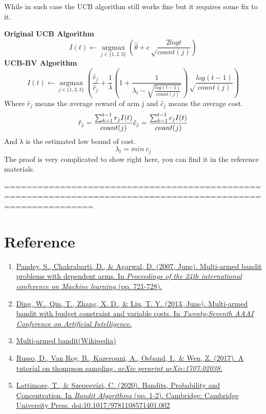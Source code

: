\documentclass[11pt]{article}
\providecommand{\tightlist}{%
      \setlength{\itemsep}{0pt}\setlength{\parskip}{0pt}}
\begin{document}
While in such case the UCB algorithm still works fine but it requires
some fix to it.

\textbf{Original UCB Algorithm} \[
I(t)\leftarrow \mathop{argmax}\limits_{j\in\{1,2,3\}}(\hat \theta+c\sqrt\frac{2logt}{count(j)})
\] \textbf{UCB-BV Algorithm} \[
I(t)\leftarrow \mathop{argmax}\limits_{j\in\{1,2,3\}}(\frac{\hat r_j}{\hat c_j}+\frac{1}{\lambda}\left(1+\frac{1}{\lambda_t-\sqrt{\frac{log(t-1)}{count(j)}}}\right)\sqrt\frac{log(t-1)}{count(j)})
\] Where \(\hat r_j\) means the average reward of arm j and \(\hat c_j\)
means the average cost. \[
\hat r_j=\frac{\sum_{k=1}^{t-1}r_jI(t)}{count(j)}\\
\hat c_j=\frac{\sum_{k=1}^{t-1}c_jI(t)}{count(j)}\\
\] And λ is the estimated low bound of cost. \[
\lambda_t=min\ c_j
\] The proof is very complicated to show right here, you can find it in
the reference materials.

    ============================================================================================================

    \section{Reference}\label{reference}

\begin{enumerate}
\def\labelenumi{\arabic{enumi}.}
\tightlist
\item
  \href{https://www.cs.cmu.edu/~spandey/publications/dependent-bandit.pdf}{Pandey,
  S., Chakrabarti, D., \& Agarwal, D. (2007, June). Multi-armed bandit
  problems with dependent arms. In \emph{Proceedings of the 24th
  international conference on Machine learning} (pp. 721-728).}
\item
  \href{https://www.aaai.org/ocs/index.php/AAAI/AAAI13/paper/view/6381/7122}{Ding,
  W., Qin, T., Zhang, X. D., \& Liu, T. Y. (2013, June). Multi-armed
  bandit with budget constraint and variable costs. In
  \emph{Twenty-Seventh AAAI Conference on Artificial Intelligence}.}
\item
  \href{https://en.wikipedia.org/wiki/Multi-armed_bandit\#Constrained_contextual_bandit}{Multi-armed
  bandit(Wikipedia)}
\item
  \href{https://web.stanford.edu/~bvr/pubs/TS_Tutorial.pdf}{Russo, D.,
  Van Roy, B., Kazerouni, A., Osband, I., \& Wen, Z. (2017). A tutorial
  on thompson sampling. \emph{arXiv preprint arXiv:1707.02038}.}
\item
  \href{https://www.cambridge.org/core/books/bandit-algorithms/bandits-probability-and-concentration/B3813F43C2BD715B352328839794C50E}{Lattimore,
  T., \& Szepesvári, C. (2020). Bandits, Probability and Concentration.
  In \emph{Bandit Algorithms} (pp. 1-2). Cambridge: Cambridge University
  Press. doi:10.1017/9781108571401.002}
\end{enumerate}
\end{document}
